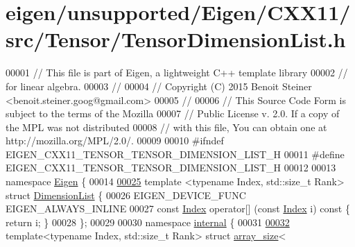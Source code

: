 \hypertarget{eigen_2unsupported_2_eigen_2_c_x_x11_2src_2_tensor_2_tensor_dimension_list_8h_source}{}\section{eigen/unsupported/\+Eigen/\+C\+X\+X11/src/\+Tensor/\+Tensor\+Dimension\+List.h}
\label{eigen_2unsupported_2_eigen_2_c_x_x11_2src_2_tensor_2_tensor_dimension_list_8h_source}

\begin{DoxyCode}
00001 \textcolor{comment}{// This file is part of Eigen, a lightweight C++ template library}
00002 \textcolor{comment}{// for linear algebra.}
00003 \textcolor{comment}{//}
00004 \textcolor{comment}{// Copyright (C) 2015 Benoit Steiner <benoit.steiner.goog@gmail.com>}
00005 \textcolor{comment}{//}
00006 \textcolor{comment}{// This Source Code Form is subject to the terms of the Mozilla}
00007 \textcolor{comment}{// Public License v. 2.0. If a copy of the MPL was not distributed}
00008 \textcolor{comment}{// with this file, You can obtain one at http://mozilla.org/MPL/2.0/.}
00009 
00010 \textcolor{preprocessor}{#ifndef EIGEN\_CXX11\_TENSOR\_TENSOR\_DIMENSION\_LIST\_H}
00011 \textcolor{preprocessor}{#define EIGEN\_CXX11\_TENSOR\_TENSOR\_DIMENSION\_LIST\_H}
00012 
00013 \textcolor{keyword}{namespace }\hyperlink{namespace_eigen}{Eigen} \{
00014 
\hyperlink{struct_eigen_1_1_dimension_list}{00025} \textcolor{keyword}{template} <\textcolor{keyword}{typename} Index, std::\textcolor{keywordtype}{size\_t} Rank> \textcolor{keyword}{struct }\hyperlink{struct_eigen_1_1_dimension_list}{DimensionList} \{
00026   EIGEN\_DEVICE\_FUNC EIGEN\_ALWAYS\_INLINE
00027   \textcolor{keyword}{const} \hyperlink{namespace_eigen_a62e77e0933482dafde8fe197d9a2cfde}{Index} operator[] (\textcolor{keyword}{const} \hyperlink{namespace_eigen_a62e77e0933482dafde8fe197d9a2cfde}{Index} i)\textcolor{keyword}{ const }\{ \textcolor{keywordflow}{return} i; \}
00028 \};
00029 
00030 \textcolor{keyword}{namespace }\hyperlink{namespaceinternal}{internal} \{
00031 
\hyperlink{struct_eigen_1_1internal_1_1array__size_3_01_dimension_list_3_01_index_00_01_rank_01_4_01_4}{00032} \textcolor{keyword}{template}<\textcolor{keyword}{typename} Index, std::\textcolor{keywordtype}{size\_t} Rank> \textcolor{keyword}{struct }\hyperlink{struct_eigen_1_1internal_1_1array__size}{array\_size}<

\end{DoxyCode}
